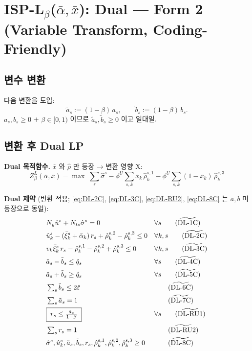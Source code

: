 \documentclass[11pt]{article}
\newcommand{\hatq}{\hat{q}}
\newcommand{\barxi}{\bar{\xi}}
\theoremstyle{plain}
\theoremstyle{remark}
\begin{document}
\section{ISP-L$_\beta$($\bar\alpha, \bar x$): Dual --- Form 2 (Variable Transform, Coding-Friendly)}
\label{sec:isp-l-dual-transformed}

\subsection{변수 변환}

다음 변환을 도입:
\begin{equation}\label{eq:transform}
\boxed{\;
\tilde a_s := (1-\beta)\,a_s,\qquad \tilde b_s := (1-\beta)\,b_s.
\;}
\end{equation}
$a_s, b_s \geq 0$ + $\beta \in [0,1)$ 이므로 $\tilde a_s, \tilde b_s \geq 0$ 이고 일대일.

\subsection{변환 후 Dual LP}

\textbf{Dual 목적함수.} $\bar x$ 와 $\hat\rho$ 만 등장 → 변환 영향 X:
\begin{equation}\label{eq:ISP-L-CVaR-obj-transformed}
\boxed{\;
Z^L_\beta(\bar\alpha, \bar x) = \max\;\textstyle\sum_s \hat\sigma^s - \phi^U \sum_{s,k} \bar x_k\, \hat\rho_k^{s,1} - \phi^U \sum_{s,k}(1-\bar x_k)\,\hat\rho_k^{s,3}
\;}
\end{equation}

\textbf{Dual 제약} (변환 적용; \eqref{eq:DL-2C}, \eqref{eq:DL-3C}, \eqref{eq:DL-RU2}, \eqref{eq:DL-8C} 는 $a, b$ 미등장으로 동일):
\begin{align}
&N_y \hat u^s + N_{ts} \hat\sigma^s = 0 && \forall s \tag{$\widetilde{\text{DL-1C}}$}\\
&\hat u_k^s - (\barxi_k^s + \bar\alpha_k)\,r_s + \hat\rho_k^{s,2} - \hat\rho_k^{s,3} \leq 0 && \forall k, s \tag{$\widetilde{\text{DL-2C}}$}\\
&v_k\barxi_k^s\, r_s - \hat\rho_k^{s,1} - \hat\rho_k^{s,2} + \hat\rho_k^{s,3} \leq 0 && \forall k, s \tag{$\widetilde{\text{DL-3C}}$}\\
&\tilde a_s - \tilde b_s \leq \hatq_s && \forall s \tag{$\widetilde{\text{DL-4C}}$}\label{eq:t-DL-4C}\\
&\tilde a_s + \tilde b_s \geq \hatq_s && \forall s \tag{$\widetilde{\text{DL-5C}}$}\label{eq:t-DL-5C}\\
&\textstyle\sum_s \tilde b_s \leq 2\hat\varepsilon && \tag{$\widetilde{\text{DL-6C}}$}\label{eq:t-DL-6C}\\
&\textstyle\sum_s \tilde a_s = 1 && \tag{$\widetilde{\text{DL-7C}}$}\label{eq:t-DL-7C}\\
&\boxed{\;r_s \leq \tfrac{\tilde a_s}{1-\beta}\;} && \forall s \tag{$\widetilde{\text{DL-RU1}}$}\label{eq:t-DL-RU1}\\
&\textstyle\sum_s r_s = 1 && \tag{$\widetilde{\text{DL-RU2}}$}\\
&\hat\sigma^s, \hat u_k^s, \tilde a_s, \tilde b_s, r_s, \hat\rho_k^{s,1}, \hat\rho_k^{s,2}, \hat\rho_k^{s,3} \geq 0 && \tag{$\widetilde{\text{DL-8C}}$}
\end{align}
\end{document}
